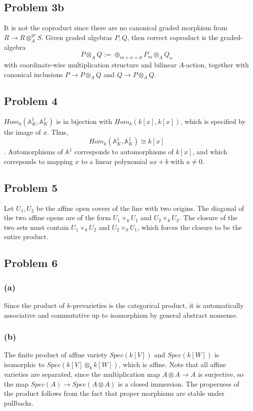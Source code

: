 \documentclass{article}
\theoremstyle{definition}
\theoremstyle{definition}
\theoremstyle{definition}
\theoremstyle{definition}
\theoremstyle{definition}
\theoremstyle{definition}
\theoremstyle{definition}
\begin{document}
\subsection*{Problem 3b}
It is not the coproduct since there are no canonical graded morphism from $R\to R\otimes^{gr}_A S$. Given graded algebras $P,Q$, then correct coproduct is the graded-algebra 
\[P\otimes_A Q:=\oplus_{m+n=d}P_m\otimes_A Q_n\]
with coordinate-wise multiplication structure and bilinear $A$-action, together with canonical inclusions $P\to P\otimes_A Q$ and $Q\to P\otimes_A Q$.


\subsection*{Problem 4}
$Hom_k(\mathbb{A}_K^1,\mathbb{A}_K^1)$ is in bijection with $Hom_k(k[x],k[x])$, which is specified by the image of $x$. Thus, \[Hom_k(\mathbb{A}_K^1,\mathbb{A}_K^1)\cong k[x]\]. Automorphisms of $\mathbb{A}^1$ corresponds to automorphisms of $k[x]$, and which correponds to mapping $x$ to a linear polynomial $ax+b$ with $a\neq 0$. 

\subsection*{Problem 5}
Let $U_1,U_2$ be the affine open covers of the line with two origins. The diagonal of the two affine opens are of the form $U_1\times_k U_1$ and $U_2\times_k U_2$. The closure of the two sets must contain $U_1\times_k U_2$ and $U_2\times_k U_1$, which forces the closure to be the entire product. 

\subsection*{Problem 6}
\subsubsection*{(a)}
Since the product of $k$-prevarieties is the categorical product, it is automatically associative and commutative up to isomorphism by general abstract nonsense.
\subsubsection*{(b)}
The finite product of affine variety $Spec(k[V])$ and $Spec(k[W])$ is isomorphic to $Spec(k[V]\otimes_k k[W])$, which is affine. Note that all affine varieties are separated, since the multiplication map $A\otimes A\to A$ is surjective, so the map $Spec(A)\to Spec(A\otimes A)$ is a closed immersion. The properness of the product follows from the fact that proper morphisms are stable under pullbacks. 
\end{document}
